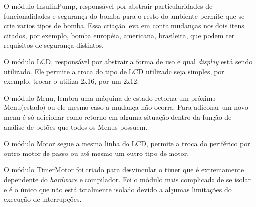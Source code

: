 O módulo InsulinPump, responsável por abstrair particularidades de funcionalidades e segurança do bomba para o resto do ambiente permite que se crie varios tipos de bomba. Essa criação leva em conta mudanças nos dois itens citados, por exemplo, bomba européia, americana, brasileira, que podem ter requisitos de segurança distintos.

O módulo LCD, responsável por abstrair a forma de uso e qual \emph{display} está sendo utilizado. Ele permite a troca do tipo de LCD utilizado seja simples, por exemplo, trocar o utiliza 2x16, por um 2x12.

O módulo Menu, lembra uma máquina de estado retorna um próximo Menu(estado) ou ele mesmo caso a mudança não ocorra. Para adiconar um novo menu é só adicionar como retorno em alguma situação dentro da função de análise de botões que todos os Menus possuem.

O módulo Motor segue a mesma linha do LCD, permite a troca do periférico por outro motor de passo ou até mesmo um outro tipo de motor.

O módulo TimerMotor foi criado para desvincular o timer que é extremamente dependente do \emph{hardware} e compilador. Foi o módulo mais complicado de se isolar e é o único que não está totalmente isolado devido a algumas limitações do execução de interrupções.

